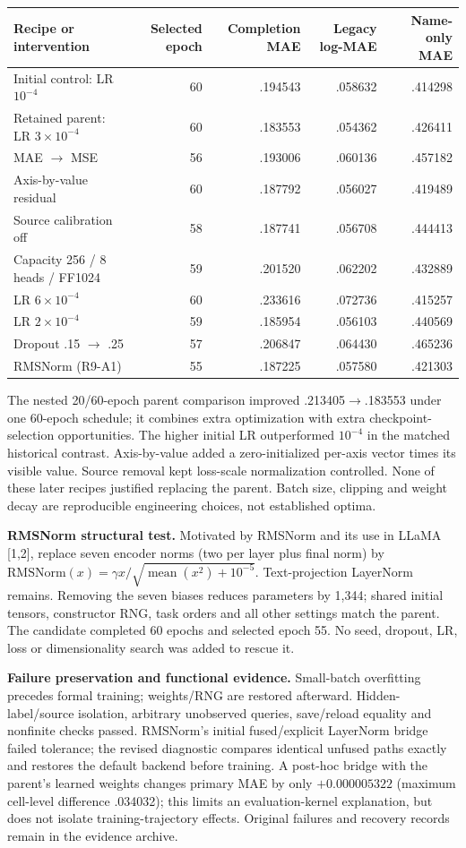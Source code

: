 \documentclass[10pt,a4paper]{article}
\newcommand{\sub}[1]{\textbf{#1}\enspace}
\newcommand{\smalltable}{\fontsize{8.7}{10.4}\selectfont}
\begin{document}
\begin{center}\smalltable
\begin{tabular}{@{}lrrrr@{}}\toprule
Recipe or intervention & Selected epoch & Completion MAE & Legacy log-MAE & Name-only MAE\\\midrule
Initial control: LR $10^{-4}$ & 60 & .194543 & .058632 & .414298\\
Retained parent: LR $3\times10^{-4}$ & 60 & .183553 & .054362 & .426411\\
MAE $\to$ MSE & 56 & .193006 & .060136 & .457182\\
Axis-by-value residual & 60 & .187792 & .056027 & .419489\\
Source calibration off & 58 & .187741 & .056708 & .444413\\
Capacity 256 / 8 heads / FF1024 & 59 & .201520 & .062202 & .432889\\
LR $6\times10^{-4}$ & 60 & .233616 & .072736 & .415257\\
LR $2\times10^{-4}$ & 59 & .185954 & .056103 & .440569\\
Dropout .15 $\to$ .25 & 57 & .206847 & .064430 & .465236\\
RMSNorm (R9-A1) & 55 & .187225 & .057580 & .421303\\\bottomrule
\end{tabular}
\end{center}
The nested 20/60-epoch parent comparison improved .213405$\to$.183553 under one 60-epoch schedule; it combines extra optimization with extra checkpoint-selection opportunities. The higher initial LR outperformed $10^{-4}$ in the matched historical contrast. Axis-by-value added a zero-initialized per-axis vector times its visible value. Source removal kept loss-scale normalization controlled. None of these later recipes justified replacing the parent. Batch size, clipping and weight decay are reproducible engineering choices, not established optima.

\sub{RMSNorm structural test.}
Motivated by RMSNorm and its use in LLaMA [1,2], replace seven encoder norms (two per layer plus final norm) by
$\mathrm{RMSNorm}(x)=\gamma x/\sqrt{\operatorname{mean}(x^2)+10^{-5}}$.
Text-projection LayerNorm remains. Removing the seven biases reduces parameters by 1,344; shared initial tensors, constructor RNG, task orders and all other settings match the parent. The candidate completed 60 epochs and selected epoch 55. No seed, dropout, LR, loss or dimensionality search was added to rescue it.

\sub{Failure preservation and functional evidence.}
Small-batch overfitting precedes formal training; weights/RNG are restored afterward. Hidden-label/source isolation, arbitrary unobserved queries, save/reload equality and nonfinite checks passed. RMSNorm's initial fused/explicit LayerNorm bridge failed tolerance; the revised diagnostic compares identical unfused paths exactly and restores the default backend before training. A post-hoc bridge with the parent's learned weights changes primary MAE by only $+0.000005322$ (maximum cell-level difference .034032); this limits an evaluation-kernel explanation, but does not isolate training-trajectory effects. Original failures and recovery records remain in the evidence archive.
\end{document}
